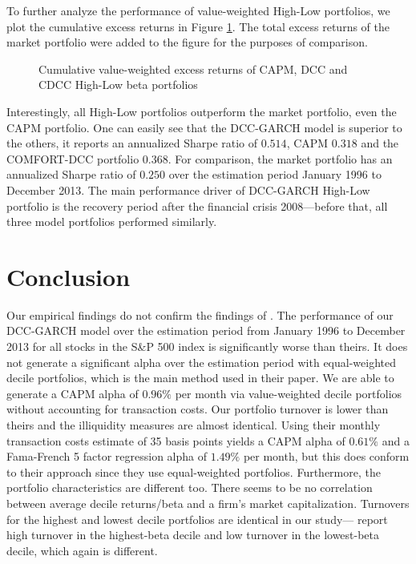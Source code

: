 \documentclass[11pt,a4paper]{article}
\def \indexName {S\&P 500}
\def \periodFrom {January 1996}
\def \periodTo {December 2013}
\begin{document}
To further analyze the performance of value-weighted High-Low portfolios, we plot the cumulative excess returns in Figure \ref{figure:vw_cum_ret_high-low}. The total excess returns of the market portfolio were added to the figure for the purposes of comparison.

\begin{figure}[H]
	\vspace{-12mm}
	\hspace{-5mm}\vspace{-15mm}
	\caption{Cumulative value-weighted excess returns of CAPM, DCC and CDCC High-Low beta portfolios}
	\label{figure:vw_cum_ret_high-low}
\end{figure}

Interestingly, all High-Low portfolios outperform the market portfolio, even the CAPM portfolio. One can easily see that the DCC-GARCH model is superior to the others, it reports an annualized Sharpe ratio of $0.514$, CAPM $0.318$ and the COMFORT-DCC portfolio $0.368$. For comparison, the market portfolio has an annualized Sharpe ratio of $0.250$ over the estimation period \periodFrom{} to \periodTo{}. The main performance driver of DCC-GARCH High-Low portfolio is the recovery period after the financial crisis 2008---before that, all three model portfolios performed similarly.





\newpage
\section{Conclusion}

Our empirical findings do not confirm the findings of . The performance of our DCC-GARCH model over the estimation period from \periodFrom{} to \periodTo{} for all stocks in the \indexName{} index is significantly worse than theirs. It does not generate a significant alpha over the estimation period with equal-weighted decile portfolios, which is the main method used in their paper. We are able to generate a CAPM alpha of $0.96\%$ per month via value-weighted decile portfolios without accounting for transaction costs. Our portfolio turnover is lower than theirs and the illiquidity measures are almost identical. Using their monthly transaction costs estimate of 35 basis points yields a CAPM alpha of $0.61\%$ and a Fama-French 5 factor regression alpha of $1.49\%$ per month, but this does conform to their approach since they use equal-weighted portfolios. Furthermore, the portfolio characteristics are different too. There seems to be no correlation between average decile returns/beta and a firm's market capitalization. Turnovers for the highest and lowest decile portfolios are identical in our study--- report high turnover in the highest-beta decile and low turnover in the lowest-beta decile, which again is different.
\end{document}
